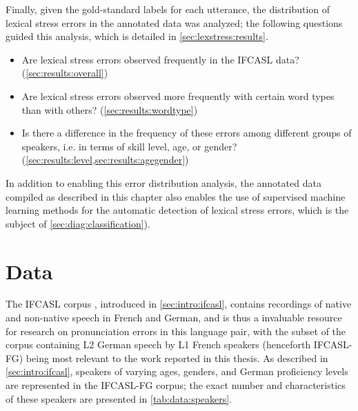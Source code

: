 	Finally, given the gold-standard labels for each utterance, the distribution of lexical stress errors in the annotated data was analyzed; the following questions guided this analysis, which is detailed in \cref{sec:lexstress:results}.
	\begin{itemize}[topsep=-1em]
	\item{Are lexical stress errors observed frequently in the IFCASL data? (\cref{sec:results:overall})}
		\item{Are lexical stress errors observed more frequently with certain word types than with others?  (\cref{sec:results:wordtype})}
	\item{Is there a difference in the frequency of these errors among different groups of speakers, i.e. in terms of skill level, age, or gender? (\cref{sec:results:level,sec:results:agegender})}
	\end{itemize}
	In addition to enabling this error distribution analysis, the annotated data compiled as described in this chapter also enables the use of supervised machine learning methods for the automatic detection of lexical stress errors, which is the subject of \cref{sec:diag:classification}).
	
	\section{Data}
	\label{sec:lexstress:data}
	
	The IFCASL corpus \citep{Trouvain2013,Fauth2014}, introduced in \cref{sec:intro:ifcasl}, contains recordings of native and non-native speech in French and German, and is thus a invaluable resource for research on pronunciation errors in this language pair, with the subset of the corpus containing L2 German speech by L1 French speakers (henceforth IFCASL-FG) being most relevant to the work reported in this thesis. As described in \cref{sec:intro:ifcasl}, speakers of varying ages, genders, and German proficiency levels are represented in the IFCASL-FG corpus; the exact number and characteristics of these speakers are presented in \cref{tab:data:speakers}.
	
